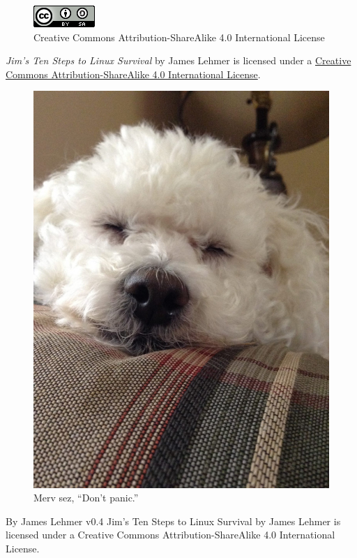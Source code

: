 \documentclass[10pt,]{book}
\numberwithin{figure}{chapter}
\begin{document}
\begin{figure}[!htbp]
\centering
\includegraphics{./images/cc-by-sa.png}%
\caption*{Creative Commons Attribution-ShareAlike 4.0 International License}%
\end{figure}

\emph{Jim's Ten Steps to Linux Survival} by James Lehmer is licensed
under a \href{http://creativecommons.org/licenses/by-sa/4.0/}{Creative
Commons Attribution-ShareAlike 4.0 International License}.
\pagestyle{headings} \else

\begin{figure}[htbp]
\centering
\includegraphics{./images/Merv.jpg}
\caption{Merv sez, ``Don't panic.''}
\end{figure}

By James Lehmer v0.4 {Jim's Ten Steps to Linux Survival} by {James
Lehmer} is licensed under a Creative Commons Attribution-ShareAlike 4.0
International License.
\end{document}
